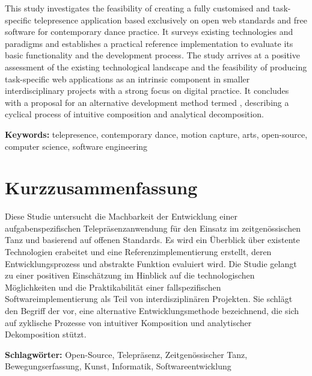 
This study investigates the feasibility of creating a fully customised and task-specific telepresence application based exclusively on open web standards and free software for contemporary dance practice.
It surveys existing technologies and paradigms and establishes a practical reference implementation to evaluate its basic functionality and the development process.
The study arrives at a positive assessment of the existing technological landscape and the feasibility of producing task-specific web applications as an intrinsic component in smaller interdisciplinary projects with a strong focus on digital practice.
It concludes with a proposal for an alternative development method termed , describing a cyclical process of intuitive composition and analytical decomposition.

\textbf{Keywords:} telepresence, contemporary dance, motion capture, arts, open-source, computer science, software engineering


\section*{Kurzzusammenfassung}

Diese Studie untersucht die Machbarkeit der Entwicklung einer aufgabenspezifischen Telepräsenzanwendung für den Einsatz im zeitgenössischen Tanz und basierend auf offenen Standards.
Es wird ein Überblick über existente Technologien erabeitet und eine Referenzimplementierung erstellt, deren Entwicklungsprozess und abstrakte Funktion evaluiert wird.
Die Studie gelangt zu einer positiven Einschätzung im Hinblick auf die technologischen Möglichkeiten und die Praktikabilität einer fallspezifischen Softwareimplementierung als Teil von interdisziplinären Projekten.
Sie schlägt den Begriff der  vor, eine alternative Entwicklungsmethode bezeichnend, die sich auf zyklische Prozesse von intuitiver Komposition und analytischer Dekomposition stützt.
 
 \textbf{Schlagwörter:} Open-Source, Telepräsenz, Zeitgenössischer Tanz, Bewegungserfassung, Kunst, Informatik, Softwareentwicklung
 